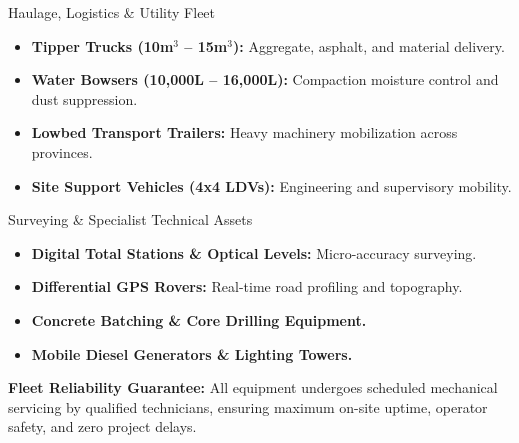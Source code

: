 \documentclass[a4paper,11pt]{article}
\begin{document}
\hfill
\begin{minipage}[t]{0.485\textwidth}
    \begin{brandcard}{Haulage, Logistics \& Utility Fleet}
        \begin{itemize}[leftmargin=12pt, itemsep=3pt, label=\color{mhblue}$\blacktriangleright$]
            \item \textbf{Tipper Trucks (10m$^3$ -- 15m$^3$):} Aggregate, asphalt, and material delivery.
            \item \textbf{Water Bowsers (10,000L -- 16,000L):} Compaction moisture control and dust suppression.
            \item \textbf{Lowbed Transport Trailers:} Heavy machinery mobilization across provinces.
            \item \textbf{Site Support Vehicles (4x4 LDVs):} Engineering and supervisory mobility.
        \end{itemize}
    \end{brandcard}

    \vspace{0.25cm}

    \begin{brandcard}{Surveying \& Specialist Technical Assets}
        \begin{itemize}[leftmargin=12pt, itemsep=3pt, label=\color{mhblue}$\blacktriangleright$]
            \item \textbf{Digital Total Stations \& Optical Levels:} Micro-accuracy surveying.
            \item \textbf{Differential GPS Rovers:} Real-time road profiling and topography.
            \item \textbf{Concrete Batching \& Core Drilling Equipment.}
            \item \textbf{Mobile Diesel Generators \& Lighting Towers.}
        \end{itemize}
    \end{brandcard}
\end{minipage}

\vspace{0.35cm}

\begin{tcolorbox}[
    enhanced,
    colback=mhnavy,
    colframe=mhnavy,
    boxrule=0pt,
    arc=3pt,
    left=10pt, right=10pt, top=8pt, bottom=8pt,
    halign=center
]
    \color{white}
    \fontsize{8.5pt}{12pt}\selectfont
    \textbf{Fleet Reliability Guarantee:} All equipment undergoes scheduled mechanical servicing by qualified technicians, ensuring maximum on-site uptime, operator safety, and zero project delays.
\end{tcolorbox}
\end{document}
